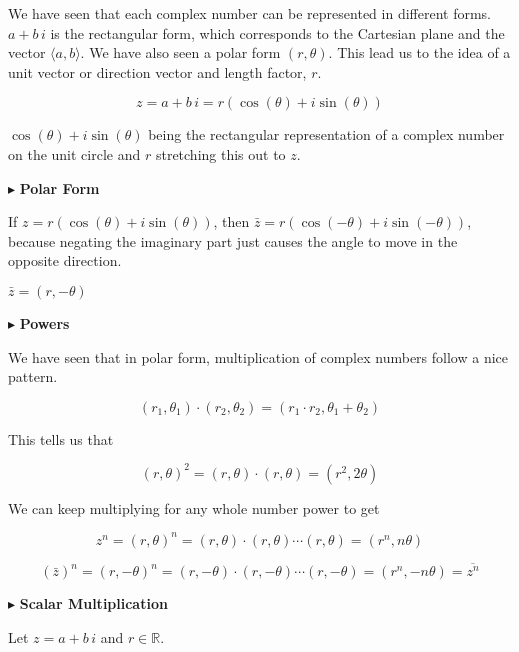 \documentclass{ximera}
\begin{document}
We have seen that each complex number can be represented in different forms.  $a + b \, i$ is the rectangular form, which corresponds to the Cartesian plane and the vector $\langle a, b\rangle$.  We have also seen a polar form $(r, \theta)$.  This lead us to the idea of a unit vector or direction vector and length factor, $r$.

\[ z = a + b \, i = r (\cos(\theta) + i \sin(\theta))  \]


$\cos(\theta) + i \sin(\theta)$ being the rectangular representation of a complex number on the unit circle and $r$ stretching this out to $z$.






$\blacktriangleright$ \textbf{Polar Form}

If $z = r (\cos(\theta) + i \sin(\theta))$, then $\bar{z} = r (\cos(-\theta) + i \sin(-\theta))$, because negating the imaginary part just causes the angle to move in the opposite direction.

$\bar{z} = (r, -\theta)$




$\blacktriangleright$ \textbf{Powers}



We have seen that in polar form, multiplication of complex numbers follow a nice pattern.


\[   (r_1, \theta_1) \cdot (r_2, \theta_2) = (r_1 \cdot r_2, \theta_1 + \theta_2)                \]



This tells us that 


\[   (r, \theta)^2 =  (r, \theta) \cdot (r, \theta) = (r^2, 2\theta)                \]



We can keep multiplying for any whole number power to get 


\[   z^n = (r, \theta)^n =  (r, \theta) \cdot (r, \theta) \cdots (r, \theta)= (r^n, n\theta)                \]




\[   (\bar{z})^n = (r, -\theta)^n =  (r, -\theta) \cdot (r, -\theta) \cdots (r, -\theta)= (r^n, -n\theta)  = \overline{z^n}              \]









$\blacktriangleright$ \textbf{Scalar Multiplication}


Let $z = a + b \, i$  and $r \in \mathbb{R}$. \\
\end{document}
